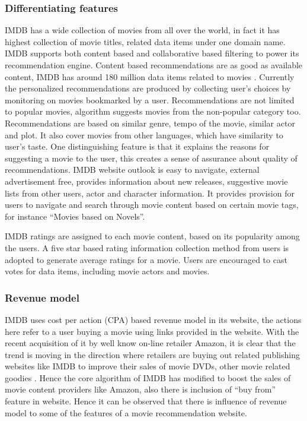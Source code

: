   \subsubsection{Differentiating features}
    \label{IMDB_overview_DF}
    \acrshort{IMDB} has a wide collection of movies from all over the world, in fact it has highest collection of movie titles, related data items under one domain name. \acrshort{IMDB} supports both content based and collaborative based filtering to power its recommendation engine. Content based recommendations are as good as available content, \acrshort{IMDB} has around 180 million data items related to movies \citep{Press_imdb_online}. Currently the personalized recommendations are produced by collecting user's choices by monitoring on movies bookmarked by a user. Recommendations are not limited to popular movies, algorithm suggests movies from the non-popular category too. Recommendations are based on similar genre, tempo of the movie, similar actor and plot. It also cover movies from other languages, which have similarity to user's taste. One distinguishing feature is that it explains the reasons for suggesting a movie to the user, this creates a sense of assurance about quality of recommendations. \acrshort{IMDB} website outlook is easy to navigate, external advertisement free, provides information about new releases, suggestive movie lists from other users, actor and character information. It provides provision for users to navigate and search through movie content based on certain movie tags, for instance ``Movies based on Novels''.  

    \acrshort{IMDB} ratings are assigned to each movie content, based on its popularity among the users. A five star based rating information collection method from users is adopted to generate average ratings for a movie. Users are encouraged to cast votes for data items, including movie actors and movies.    
  \subsubsection{Revenue model}
    \label{IMDB_overview_RM}
    \acrshort{IMDB} uses cost per action (CPA) based revenue model in its website, the actions here refer to a user buying a movie using links provided in the website. With the recent acquisition of it by well know on-line retailer Amazon, it is clear that the trend is moving in the direction where retailers are buying out related publishing websites like \acrshort{IMDB} to improve their sales of movie DVDs, other movie related goodies \citep{How_I4_online}. Hence the core algorithm of \acrshort{IMDB} has modified to boost the sales of movie content providers like Amazon, also there is inclusion of ``buy from'' feature in website. Hence it can be observed that there is influence of revenue model to some of the features of a movie recommendation website. 
